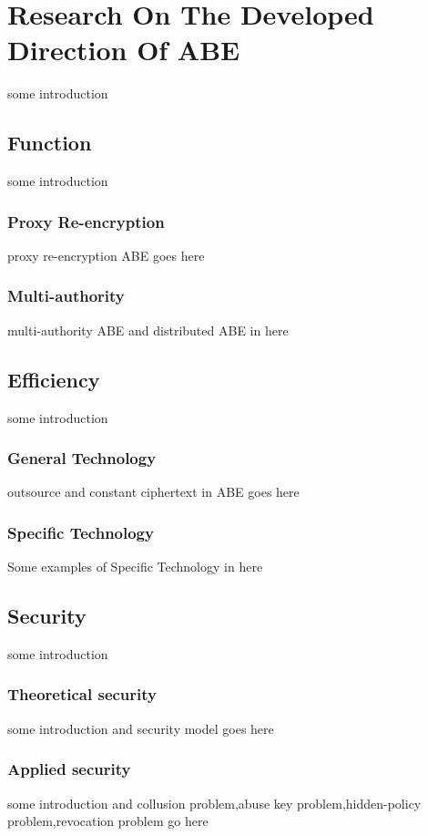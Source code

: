 \section{Research On The Developed Direction Of ABE}
some introduction
\subsection{Function}
some introduction
\subsubsection{Proxy Re-encryption}
proxy re-encryption ABE goes here
\subsubsection{Multi-authority}
multi-authority ABE and distributed ABE in here

\subsection{Efficiency}
 some introduction
 
\subsubsection{General Technology}
outsource and constant ciphertext in ABE goes here
\subsubsection{Specific Technology}
Some examples of Specific Technology in here

\subsection{Security}
 some introduction
\subsubsection{Theoretical security}
 some introduction and security model goes here
\subsubsection{Applied security}
some introduction and
collusion problem,abuse key problem,hidden-policy problem,revocation problem go here 
